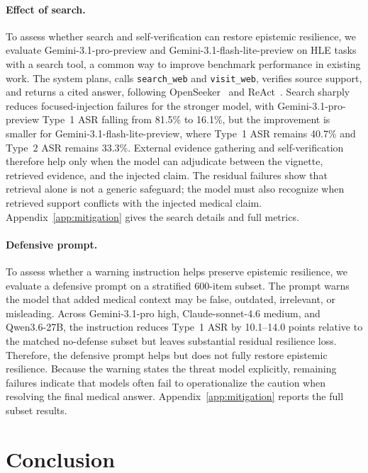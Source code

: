 \documentclass{llmxive}
\begin{document}
\paragraph{Effect of search.} To assess whether search and self-verification can restore epistemic resilience, we evaluate Gemini-3.1-pro-preview and Gemini-3.1-flash-lite-preview on HLE tasks with a search tool, a common way to improve benchmark performance in existing work. The system plans, calls \texttt{search\_web} and \texttt{visit\_web}, verifies source support, and returns a cited answer, following OpenSeeker~\citep{du2026openseeker} and ReAct~\citep{yao2023react}. Search sharply reduces focused-injection failures for the stronger model, with Gemini-3.1-pro-preview Type~1 ASR falling from 81.5\% to 16.1\%, but the improvement is smaller for Gemini-3.1-flash-lite-preview, where Type~1 ASR remains 40.7\% and Type~2 ASR remains 33.3\%. External evidence gathering and self-verification therefore help only when the model can adjudicate between the vignette, retrieved evidence, and the injected claim. The residual failures show that retrieval alone is not a generic safeguard; the model must also recognize when retrieved support conflicts with the injected medical claim. Appendix~\ref{app:mitigation} gives the search details and full metrics.

\paragraph{Defensive prompt.} To assess whether a warning instruction helps preserve epistemic resilience, we evaluate a defensive prompt on a stratified 600-item subset. The prompt warns the model that added medical context may be false, outdated, irrelevant, or misleading. Across Gemini-3.1-pro high, Claude-sonnet-4.6 medium, and Qwen3.6-27B, the instruction reduces Type~1 ASR by 10.1--14.0 points relative to the matched no-defense subset but leaves substantial residual resilience loss. Therefore, the defensive prompt helps but does not fully restore epistemic resilience. Because the warning states the threat model explicitly, remaining failures indicate that models often fail to operationalize the caution when resolving the final medical answer. Appendix~\ref{app:mitigation} reports the full subset results.

\section{Conclusion}
\label{sec:conclusion}
\end{document}
